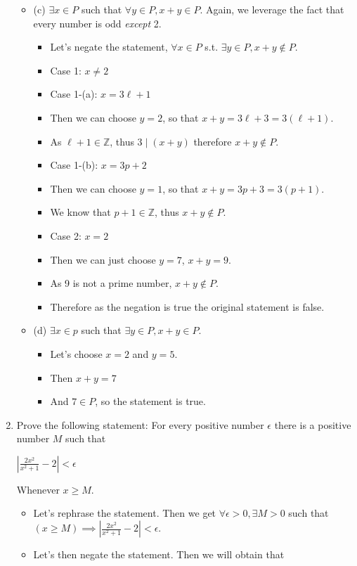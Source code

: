 \documentclass[letterpaper,12pt]{article}
\begin{document}
\begin{enumerate}
\begin{itemize}
	\item (c) $\exists x \in P $ such that $\forall y \in P, x+y \in P.$ Again, we leverage the fact that every number is odd \textit{except} 2.
	\begin{itemize}
	\item Let's negate the statement, $\forall x\in P$ s.t. $\exists y \in P, x+y \notin P.$
	\item Case 1: $x \neq 2$
	\item Case 1-(a): $x=3\ell+1$
	\item Then we can choose $y=2$, so that $x+y = 3\ell+3=3(\ell+1)$.
	\item As $\ell+1 \in \mathbb{Z}$, thus $3\mid (x+y)$ therefore $x+y \notin P$.
	\item Case 1-(b): $x=3p+2$
	\item Then we can choose $y=1$, so that $x+y=3p+3=3(p+1).$
	\item We know that $p+1\in \mathbb{Z}$, thus $x+y \notin P.$
	\item Case 2: $x=2$
	\item Then we can just choose $y=7$, $x+y=9$.
	\item As 9 is not a prime number, $x+y \notin P$.
	\item Therefore as the negation is true the original statement is false.
	\end{itemize}
	\item (d) $\exists x \in p $ such that $\exists y \in P, x+y \in P$.
	\begin{itemize}
	\item Let's choose $x=2$ and $y=5$.
	\item Then $x+y=7$
	\item And $7 \in P$, so the statement is true. 
	\end{itemize}
\end{itemize}
\item Prove the following statement: For every positive number $\epsilon$ there is a positive number $M$ such that
\begin{center}
	$|\frac{2x^2}{x^2+1}-2| < \epsilon$
\end{center}
Whenever $x \geq M$.
\begin{itemize}
	\item Let's rephrase the statement. Then we get $\forall \epsilon>0, \exists M>0$ such that \\ $(x\geq M) \implies |\frac{2x^2}{x^2+1}-2| < \epsilon$.
	\item Let's then negate the statement. Then we will obtain that \\

\end{itemize}
\end{enumerate}
\end{document}
